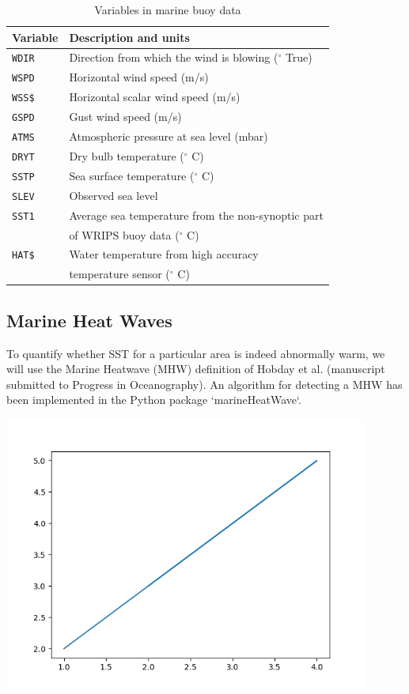 \documentclass[12pt, letterpaper]{article}
\begin{document}
\begin{table}[h]
\begin{tabular}{|l|l|}
\hline
Variable & Description and units                                                      \\ \hline
\texttt{WDIR }    & Direction from which the wind is blowing ($^\circ$ True)                          \\
\texttt{WSPD}     & Horizontal wind speed (m/s)                                                \\
\texttt{WSS\$}    & Horizontal scalar wind speed (m/s)                                         \\
\texttt{GSPD}    & Gust wind speed (m/s)                                                      \\
\texttt{ATMS}     & Atmospheric pressure at sea level (mbar)                                   \\
\texttt{DRYT}     & Dry bulb temperature ($^\circ$ C)                                                  \\
\texttt{SSTP}     & Sea surface temperature ($^\circ$ C)                                               \\
\texttt{SLEV}     & Observed sea level                                                         \\
\texttt{SST1}     & Average sea temperature from the non-synoptic part \\
  & of WRIPS buoy data ($^\circ$ C) \\
\texttt{HAT\$}    & Water temperature from high accuracy \\ & temperature sensor ($^\circ$ C)               \\ \hline
\end{tabular}
\caption{Variables in marine buoy data}
\label{tbl:datafields}
\end{table}

\subsection{Marine Heat Waves}

To quantify whether SST for a particular area is indeed abnormally warm, we will use the Marine Heatwave (MHW) definition of Hobday et al. (manuscript submitted to Progress in Oceanography).  An algorithm for detecting a MHW has been implemented in the Python package `marineHeatWave`.

\includegraphics[width=0.9\textwidth]{myplot}
\end{document}
